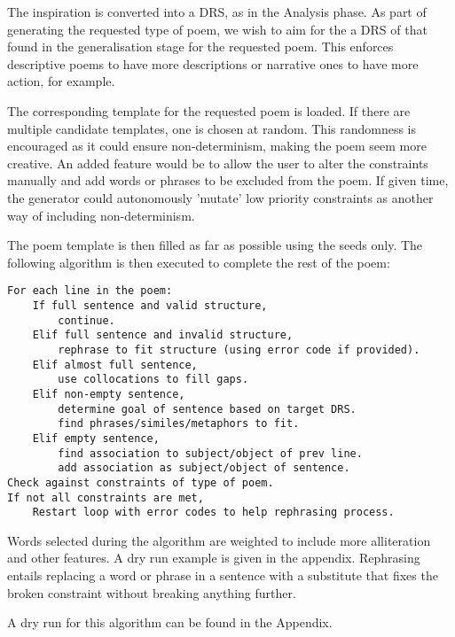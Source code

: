 The inspiration is converted into a DRS, as in the Analysis phase. As part of generating the requested type of poem, we wish to aim for the a DRS of that found in the generalisation stage for the requested poem. This enforces descriptive poems to have more descriptions or narrative ones to have more action, for example.

The corresponding template for the requested poem is loaded. If there are multiple candidate templates, one is chosen at random. This randomness is encouraged as it could ensure non-determinism, making the poem seem more creative. An added feature would be to allow the user to alter the constraints manually and add words or phrases to be excluded from the poem. If given time, the generator could autonomously 'mutate' low priority constraints as another way of including non-determinism.

The poem template is then filled as far as possible using the seeds only. The following algorithm is then executed to complete the rest of the poem:\\

\begin{lstlisting}
For each line in the poem:
	If full sentence and valid structure, 
		continue.
	Elif full sentence and invalid structure, 
		rephrase to fit structure (using error code if provided).
	Elif almost full sentence, 
		use collocations to fill gaps.
	Elif non-empty sentence,
		determine goal of sentence based on target DRS.
		find phrases/similes/metaphors to fit.
	Elif empty sentence,
		find association to subject/object of prev line.
		add association as subject/object of sentence.
Check against constraints of type of poem.
If not all constraints are met,
	Restart loop with error codes to help rephrasing process.
\end{lstlisting}		
Words selected during the algorithm are weighted to include more alliteration and other features. A dry run example is given in the appendix. Rephrasing entails replacing a word or phrase in a sentence with a substitute that fixes the broken constraint without breaking anything further. 

A dry run for this algorithm can be found in the Appendix.

